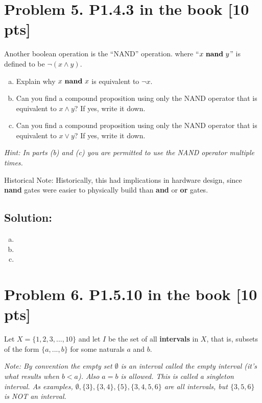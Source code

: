 \documentclass[12pt]{article}
\begin{document}
\section*{\textbf{Problem 5. P1.4.3 in the book} [10 pts]}
Another boolean operation is the ``NAND'' operation. where ``$x \ \mbox{\bf nand}\  y$'' is defined to be $\neg(x \wedge y).$
\begin{enumerate}[(a)]
    \item Explain why $x \ \mbox{\bf nand}\  x$ is equivalent to $\neg x.$
    \item Can you find a compound proposition using only the NAND operator that is equivalent to $x \wedge y$? If yes, write it down.
    \item Can you find a compound proposition using only the NAND operator that is equivalent to $x \vee y$? If yes, write it down.
\end{enumerate}
{\em Hint: In parts (b) and (c) you are permitted to use the NAND operator multiple times.
\par\noindent 
Historical Note: Historically, this had  implications in  hardware design, since {\bf nand} gates were easier to physically build than {\bf and} or {\bf or} gates.}

\subsection*{\textbf{Solution:}}
\begin{enumerate}[(a)]
\item 
\item 
\item
\end{enumerate}





\newpage
\section*{\textbf{Problem 6. P1.5.10 in the book} [10 pts]}
Let $X = \{1, 2, 3,. .., 10\}$ and let $I$ be the set of all \textbf{intervals} in $X$, that is, subsets of the form $\{a,. .., b\}$ for some naturals $a$ and $b$.

\medskip
{\em \small Note: By convention the empty set $\emptyset$ is an interval called the {\em empty interval} (it's what results when $b <a$).  Also $a=b$ is allowed.  This is called a singleton interval. As examples,  $\emptyset, \{3\}, \{3,4\},  \{5\} , \{3,4,5,6\}$ are all intervals,  but $\{3,5,6\}$ is NOT an interval.}
\end{document}
